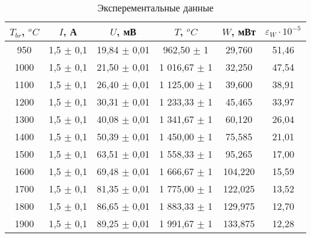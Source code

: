 \begin{table}[h!]
    \centering
    \begin{tabular}{|c|c|c|c|c|c|}
    \hline
    $T_{br}$, $^oC$   & $I$, А              & $U$, мВ                & $T$, $^oC$                 & $W$, мВт   & $\varepsilon_W \cdot 10^{-5}$      \\ \hline
    950               & 1,5 $\pm$ 0,1       & 19,84 $\pm$ 0,01       & 962,50   $\pm$ 1           & 29,760     & 51,46                              \\ \hline
    1000              & 1,5 $\pm$ 0,1       & 21,50 $\pm$ 0,01       & 1 016,67 $\pm$ 1           & 32,250     & 47,54                              \\ \hline
    1100              & 1,5 $\pm$ 0,1       & 26,40 $\pm$ 0,01       & 1 125,00 $\pm$ 1           & 39,600     & 38,91                              \\ \hline
    1200              & 1,5 $\pm$ 0,1       & 30,31 $\pm$ 0,01       & 1 233,33 $\pm$ 1           & 45,465     & 33,97                              \\ \hline
    1300              & 1,5 $\pm$ 0,1       & 40,08 $\pm$ 0,01       & 1 341,67 $\pm$ 1           & 60,120     & 26,04                              \\ \hline
    1400              & 1,5 $\pm$ 0,1       & 50,39 $\pm$ 0,01       & 1 450,00 $\pm$ 1           & 75,585     & 21,01                              \\ \hline
    1500              & 1,5 $\pm$ 0,1       & 63,51 $\pm$ 0,01       & 1 558,33 $\pm$ 1           & 95,265     & 17,00                              \\ \hline
    1600              & 1,5 $\pm$ 0,1       & 69,48 $\pm$ 0,01       & 1 666,67 $\pm$ 1           & 104,220    & 15,59                              \\ \hline
    1700              & 1,5 $\pm$ 0,1       & 81,35 $\pm$ 0,01       & 1 775,00 $\pm$ 1           & 122,025    & 13,52                              \\ \hline
    1800              & 1,5 $\pm$ 0,1       & 86,65 $\pm$ 0,01       & 1 883,33 $\pm$ 1           & 129,975    & 12,70                              \\ \hline
    1900              & 1,5 $\pm$ 0,1       & 89,25 $\pm$ 0,01       & 1 991,67 $\pm$ 1           & 133,875    & 12,28                              \\ \hline
    \end{tabular}
    \caption{Эксперементальные данные}
    \label{table:1}
\end{table}